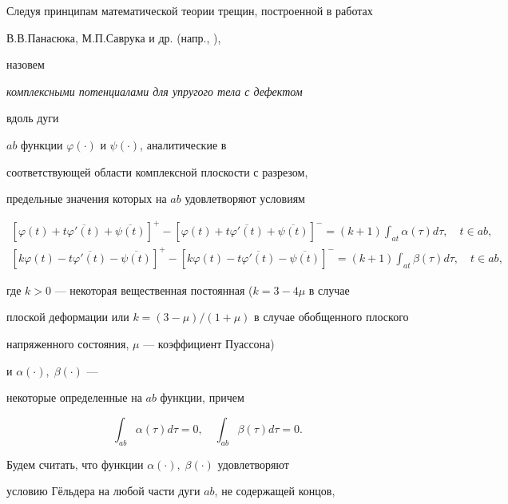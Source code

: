 Следуя принципам математической теории трещин, построенной в работах


В.В.Па\-на\-сю\-ка, М.П.Сав\-ру\-ка и др. (напр., \cite{Svr.DZUTT}),


назовем {\it комплексными потенциалами для упругого тела с дефектом


вдоль дуги} $ab$ функции $\varphi(\cdot)$ и $\psi(\cdot)$, аналитические в


соответствующей области комплексной плоскости с разрезом,


предельные значения которых на $ab$ удовлетворяют условиям


\begin{gather}


[\varphi(t)+t\overline{\varphi'(t)}+\overline{\psi(t)}]^+


- [\varphi(t)+t\overline{\varphi'(t)}+\overline{\psi(t)}]^- =


(k+1)\int_{at}\alpha(\tau)d\tau,


\quad t\in ab, \\


%


[k\varphi(t)-t\overline{\varphi'(t)}-\overline{\psi(t)}]^+


- [k\varphi(t)-t\overline{\varphi'(t)}-\overline{\psi(t)}]^- =


(k+1)\int_{at}\beta(\tau)d\tau,


\quad t\in ab,


\end{gather}


где $k>0$ --- некоторая вещественная постоянная ($k=3-4\mu$ в случае


плоской деформации или $k=(3-\mu)/(1+\mu)$ в случае обобщенного плоского


напряженного состояния, $\mu$ --- коэффициент Пуассона)


и $\alpha(\cdot),\;\beta(\cdot)$ ---


некоторые определенные на $ab$ функции, причем


\begin{equation}


\int_{ab}\alpha(\tau)d\tau=0, \quad \int_{ab}\beta(\tau)d\tau=0.


\end{equation}


Будем считать, что функции $\alpha(\cdot),\;\beta(\cdot)$ удовлетворяют


условию Г\"ельдера на любой части дуги $ab$, не содержащей концов,


